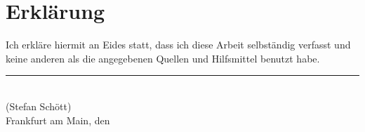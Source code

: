 
\cleardoublepage
\thispagestyle{plain}
\vspace*{\fill}

\section*{Erklärung}

Ich erkläre hiermit an Eides statt, dass ich diese Arbeit selbständig verfasst und keine
anderen als die angegebenen Quellen und Hilfsmittel benutzt habe.

\vskip2cm

\rule{5cm}{0.4pt}\\
(Stefan Schött)\\
Frankfurt am Main, den \duedate
